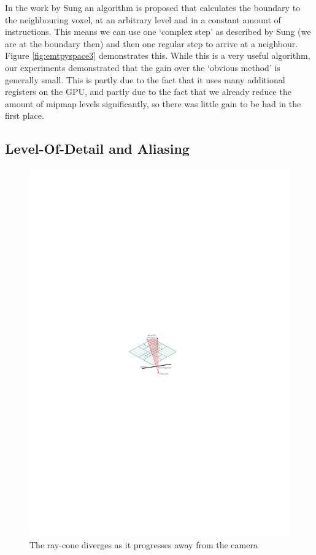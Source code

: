 In the work by Sung \cite{sung91} an algorithm is proposed that calculates the boundary to the neighbouring voxel, at an arbitrary level and in a constant amount of instructions. This means we can use one `complex step' as described by Sung (we are at the boundary then) and then one regular step to arrive at a neighbour. Figure \ref{fig:emtpyspace3} demonstrates this. While this is a very useful algorithm, our experiments demonstrated that the gain over the `obvious method' is generally small. This is partly due to the fact that it uses many additional registers on the GPU, and partly due to the fact that we already reduce the amount of mipmap levels significantly, so there was little gain to be had in the first place.
%
\subsection{Level-Of-Detail and Aliasing}
%
%
\begin{figure}[b!]
\centering
\includegraphics[scale=1.0]{figures/raytracing_cones.pdf} 
\caption{The ray-cone diverges as it progresses away from the camera}
\label{fig:cones}
\end{figure}
